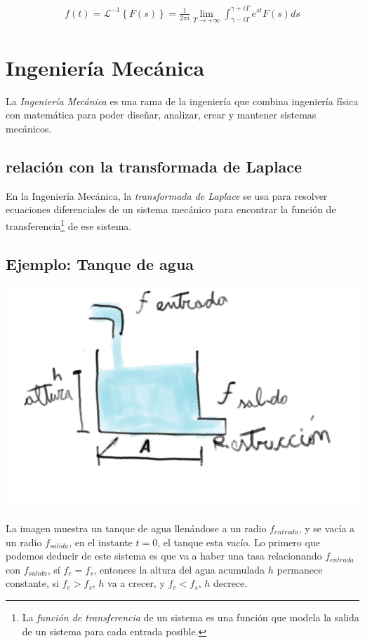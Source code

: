 \documentclass{article}
\begin{document}
\begin{align*}
    f\left(t\right) = \mathcal{L}^{-1} \left\{F\left(s\right)\right\} = \frac{1}{2\pi i} \lim_{T \to +\infty} \int_{\gamma - iT}^{{\gamma + iT}} e^{st} F \left(s\right) ds
\end{align*}

\newpage

\section{Ingeniería Mecánica}

La \emph{Ingeniería Mecánica} es una rama de la ingeniería que combina ingeniería física con matemática para poder diseñar, analizar, crear y mantener sistemas mecánicos.

\subsection{relación con la transformada de Laplace}


En la Ingeniería Mecánica, la \emph{transformada de Laplace} se usa para resolver ecuaciones diferenciales de un sistema mecánico para encontrar la función de transferencia\footnote{La \emph{función de transferencia} de un sistema es una función que modela la salida de un sistema para cada entrada posible.} de ese sistema.

\subsection{Ejemplo: Tanque de agua}

\includegraphics{tank}

La imagen muestra un tanque de agua llenándose a un radio $f_{entrada}$, y se vacía a un radio $f_{salida}$, en el instante $t = 0$, el tanque esta vacío. Lo primero que podemos deducir de este sistema es que va a haber una tasa relacionando $f_{entrada}$ con $f_{salida}$, sí $f_e = f_s$, entonces la altura del agua acumulada $h$ permanece constante, si $f_e > f_s$, $h$ va a crecer, y $f_e < f_s$, $h$ decrece.
\end{document}
